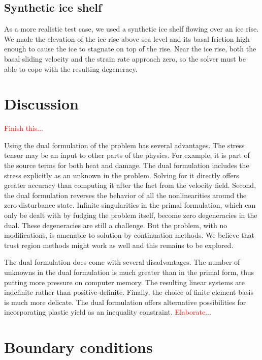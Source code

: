 \documentclass{article}
\theoremstyle{definition}
\theoremstyle{plain}
\begin{document}
\subsection{Synthetic ice shelf}

As a more realistic test case, we used a synthetic ice shelf flowing over an ice rise.
We made the elevation of the ice rise above sea level and its basal friction high enough to cause the ice to stagnate on top of the rise.
Near the ice rise, both the basal sliding velocity and the strain rate approach zero, so the solver must be able to cope with the resulting degeneracy.


\section{Discussion}

\textcolor{red}{Finish this...}

Using the dual formulation of the problem has several advantages.
The stress tensor may be an input to other parts of the physics.
For example, it is part of the source terms for both heat and damage.
The dual formulation includes the stress explicitly as an unknown in the problem.
Solving for it directly offers greater accuracy than computing it after the fact from the velocity field.
Second, the dual formulation reverses the behavior of all the nonlinearities around the zero-disturbance state.
Infinite singularities in the primal formulation, which can only be dealt with by fudging the problem itself, become zero degeneracies in the dual.
These degeneracies are still a challenge.
But the problem, with no modifications, is amenable to solution by continuation methods.
We believe that trust region methods might work as well and this remains to be explored.

The dual formulation does come with several disadvantages.
The number of unknowns in the dual formulation is much greater than in the primal form, thus putting more pressure on computer memory.
The resulting linear systems are indefinite rather than positive-definite.
Finally, the choice of finite element basis is much more delicate.
The dual formulation offers alternative possibilities for incorporating plastic yield as an inequality constraint.
\textcolor{red}{Elaborate...}


\appendix

\section{Boundary conditions} \label{sec:boundary-conditions}
\end{document}
